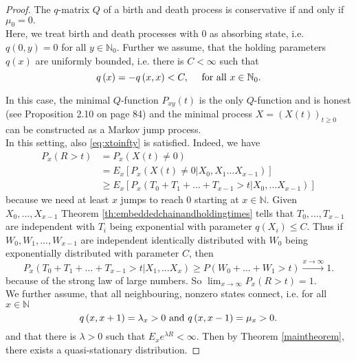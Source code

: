 \documentclass[12pt,a4paper]{scrartcl}
\numberwithin{equation}{section}
\newcommand{\N}{\mathbb{N}} %
\begin{document}
\begin{proof}
The $q$-matrix $Q$ of a birth and death process is conservative if and only if $\mu_0 = 0.$ \\[2ex]

Here, we treat birth and death processes with $0$ as absorbing state, i.e. $q\left(0,y\right) = 0$ for all $y \in \N_0$. Further we assume, that the holding parameters $q\left(x\right)$ are uniformly bounded, i.e. there is $C < \infty$ such that 
\begin{equation} \label{eq:uniformlyboundedqmatrix}
q\left(x\right) = -q\left(x,x\right) < C, \quad \textnormal{ for all } x \in \N_0.
\end{equation}

In this case, the minimal $Q$-function $P_{xy}\left(t\right)$ is the only $Q$-function and is honest (see \cite{anderson} Proposition 2.10 on page 84) and the minimal process $X = \left(X\left(t\right)\right)_{t \geq 0}$ can be constructed as a Markov jump process. \\[2ex]
In this setting, also \eqref{eq:xtoinfty} is satisfied. Indeed, we have
\begin{align*}
P_x\left(R > t \right) &= P_x\left( X\left(t\right) \neq 0 \right) \\
&= E_x\left[ P_x\left(X\left(t\right) \neq 0 | X_0, X_1 \ldots X_{x-1} \right)  \right] \\
&\geq E_x\left[ P_x\left(T_0 + T_1 + \ldots + T_{x-1} > t | X_0, \ldots X_{x-1} \right) \right]
\end{align*}
because we need at least $x$ jumps to reach $0$ starting at $x \in \N.$
Given $X_0,\ldots,X_{x-1}$ Theorem \ref{th:embeddedchainandholdingtimes} tells that $T_0,\ldots,T_{x-1}$ are independent with $T_i$ being exponential with parameter $q\left(X_i\right) \leq C.$ Thus if $W_0,W_1,\ldots, W_{x-1}$ are independent identically distributed with $W_0$ being exponentially distributed with parameter $C$, then
$$ P_x\left(T_0 + T_1 + \ldots + T_{x-1} > t | X_1, \ldots X_x \right) \geq P\left(W_0 + \ldots + W_1 > t \right) \overset{x \to \infty}{\to} 1. $$
because of the strong law of large numbers.
So $\lim_{x \to \infty} P_x\left( R > t\right) = 1.$ \\[2ex]



We further assume, that all neighbouring, nonzero states connect, i.e. for all $x \in \N$
\begin{equation} 
q\left(x,x+1\right) = \lambda_x > 0 \textnormal{ and } q\left(x,x-1\right) = \mu_x > 0.
\end{equation}
and that there is $\lambda > 0$ such that $E_x e^{\lambda R} < \infty.$ Then by Theorem \ref{maintheorem}, there exists a quasi-stationary distribution. 


\end{proof}
\end{document}
